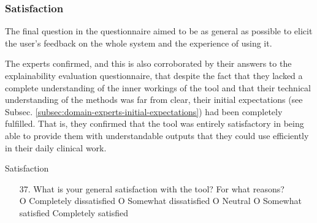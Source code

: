 \subsubsection{Satisfaction}
The final question in the questionnaire aimed to be as general as possible to elicit the user's feedback on the whole system and the experience of using it.


The experts confirmed, and this is also corroborated by their answers to the explainability evaluation questionnaire, that despite the fact that they lacked a complete understanding of the inner workings of the tool and that their technical understanding of the methods was far from clear, their initial expectations (see Subsec. \ref{subsec:domain-experts-initial-expectations}) had been completely fulfilled.
That is, they confirmed that the tool was entirely satisfactory in being able to provide them with understandable outputs that they could use efficiently in their daily clinical work.

\begin{framed}
	{\Large Satisfaction}
	\begin{enumerate}[resume]
		\item[37.] What is your general satisfaction with the tool? For what reasons? \\
		O Completely dissatisfied O Somewhat dissatisfied O Neutral O Somewhat satisfied  Completely satisfied
	\end{enumerate}
	\label{ann:questionnaire}
\end{framed}
